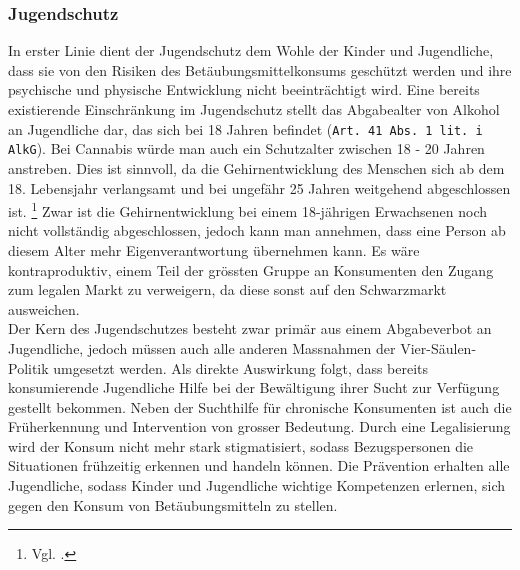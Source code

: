 \documentclass[../main.tex]{subfiles}
\begin{document}
	 \subsubsection{Jugendschutz}
	 In erster Linie dient der Jugendschutz dem Wohle der Kinder und Jugendliche, dass sie von den Risiken des Betäubungsmittelkonsums geschützt werden und ihre psychische und physische Entwicklung nicht beeinträchtigt wird. 
	 Eine bereits existierende Einschränkung im Jugendschutz stellt das Abgabealter von Alkohol an Jugendliche dar, das sich bei 18 Jahren befindet (\texttt{Art. 41 Abs. 1 lit. i AlkG}). 
	 Bei Cannabis würde man auch ein Schutzalter zwischen 18 - 20 Jahren anstreben. 
	 Dies ist sinnvoll, da die Gehirnentwicklung des Menschen sich ab dem 18. Lebensjahr verlangsamt und bei ungefähr 25 Jahren weitgehend abgeschlossen ist.%
	 \footnote{Vgl. \cite{arain-2013}.}
	 Zwar ist die Gehirnentwicklung bei einem 18-jährigen Erwachsenen noch nicht vollständig abgeschlossen, jedoch kann man annehmen, dass eine Person ab diesem Alter mehr Eigenverantwortung übernehmen kann.
	 Es wäre kontraproduktiv, einem Teil der grössten Gruppe an Konsumenten den Zugang zum legalen Markt zu verweigern, da diese sonst auf den Schwarzmarkt ausweichen.\\
	 
	 \noindent
	 Der Kern des Jugendschutzes besteht zwar primär aus einem Abgabeverbot an Jugendliche, jedoch müssen auch alle anderen Massnahmen der Vier-Säulen-Politik umgesetzt werden. 
	 Als direkte Auswirkung folgt, dass bereits konsumierende Jugendliche Hilfe bei der Bewältigung ihrer Sucht zur Verfügung gestellt bekommen. 
	 Neben der Suchthilfe für chronische Konsumenten ist auch die Früherkennung und Intervention von grosser Bedeutung. 
	 Durch eine Legalisierung wird der Konsum nicht mehr stark stigmatisiert, sodass Bezugspersonen die Situationen frühzeitig erkennen und handeln können. 
	 Die Prävention erhalten alle Jugendliche, sodass Kinder und Jugendliche wichtige Kompetenzen erlernen, sich gegen den Konsum von Betäubungsmitteln zu stellen.  
	 
\end{document}
